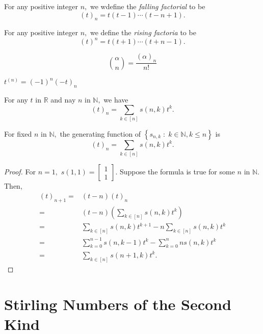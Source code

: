 
\begin{definition}
	For any positive integer $n,$ we wdefine the \emph{falling factorial} to be 
	$$ (t)_n = t(t-1) \cdots (t - n+1).$$
\end{definition}


\begin{definition}
	For any positive integer $n,$ we define the \emph{rising factoria} to be 
	$$ (t)^n = t(t+1) \cdots (t + n-1).$$
\end{definition}


\begin{remark}
	$$\binom{ \alpha } {n} = \frac{( \alpha)_n}{n!} $$
\end{remark}

\begin{remark}
	$ t^{(n)} = (-1)^n (-t)_n $
\end{remark}


\begin{theorem}
	For any $t$ in $\mathbb{R}$ and nay $n $ in $\mathbb{N},$ we have
	$$(t)_n = \sum_{k \in [n]} s(n,k) t^k. $$
\end{theorem}

\begin{remark}
	For fixed $n$ in $\mathbb{N},$ the generating function of 
	$\left\{ s_{n,k} \;:\; k \in \mathbb{N} , k \leq n \right\} $ is
	$$ (t)_n = \sum_{k \in [n]} s(n,k)t^k. $$
\end{remark}
\begin{proof}
	For $n=1,$ $s(1,1) = 
	\begin{bmatrix} 1\\1 \end{bmatrix}.$
Suppose the formula is true for some $n$ in $\mathbb{N}.$ Then,
\begin{align*}
	(t)_{n+1}
	={}& (t-n) (t)_n \\
	={}& (t-n) \left( \sum_{k \in [n]} s(n,k) t^k \right)  \\
	={}& \sum_{k \in [n]} s(n,k) t^{k+1} - n \sum_{k \in [n]} s(n,k) t^k  \\
	={}& \sum_{k=0}^{n-1} s(n,k-1) t^k - \sum_{k=0}^{n} n s(n,k) t^k\\
	={}& \sum_{k \in [n]} s(n+1,k) t^k.
\end{align*}
\end{proof}



\section{Stirling Numbers of the Second Kind}

